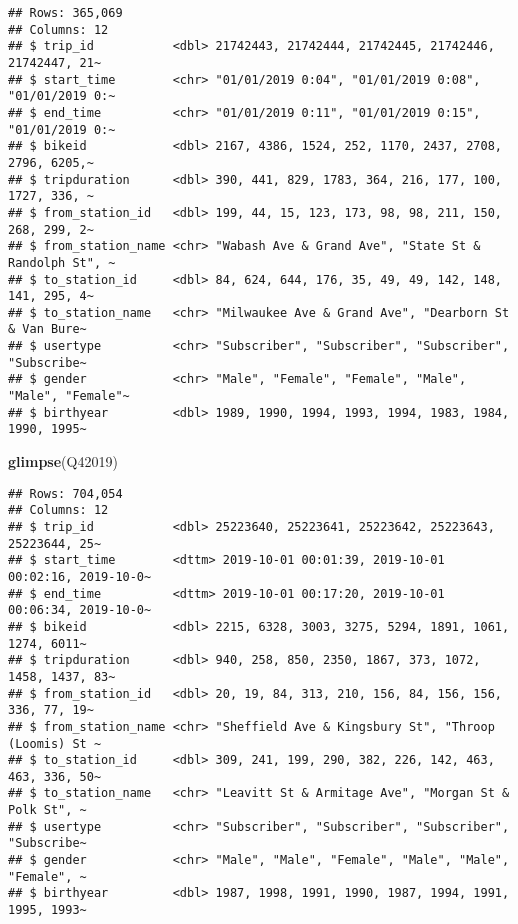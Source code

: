 \documentclass[
]{article}
\newenvironment{Shaded}{\begin{snugshade}}{\end{snugshade}}
\newcommand{\FunctionTok}[1]{\textcolor[rgb]{0.13,0.29,0.53}{\textbf{#1}}}
\newcommand{\NormalTok}[1]{#1}
\begin{document}
\begin{verbatim}
## Rows: 365,069
## Columns: 12
## $ trip_id           <dbl> 21742443, 21742444, 21742445, 21742446, 21742447, 21~
## $ start_time        <chr> "01/01/2019 0:04", "01/01/2019 0:08", "01/01/2019 0:~
## $ end_time          <chr> "01/01/2019 0:11", "01/01/2019 0:15", "01/01/2019 0:~
## $ bikeid            <dbl> 2167, 4386, 1524, 252, 1170, 2437, 2708, 2796, 6205,~
## $ tripduration      <dbl> 390, 441, 829, 1783, 364, 216, 177, 100, 1727, 336, ~
## $ from_station_id   <dbl> 199, 44, 15, 123, 173, 98, 98, 211, 150, 268, 299, 2~
## $ from_station_name <chr> "Wabash Ave & Grand Ave", "State St & Randolph St", ~
## $ to_station_id     <dbl> 84, 624, 644, 176, 35, 49, 49, 142, 148, 141, 295, 4~
## $ to_station_name   <chr> "Milwaukee Ave & Grand Ave", "Dearborn St & Van Bure~
## $ usertype          <chr> "Subscriber", "Subscriber", "Subscriber", "Subscribe~
## $ gender            <chr> "Male", "Female", "Female", "Male", "Male", "Female"~
## $ birthyear         <dbl> 1989, 1990, 1994, 1993, 1994, 1983, 1984, 1990, 1995~
\end{verbatim}

\begin{Shaded}
\begin{Highlighting}[]
\FunctionTok{glimpse}\NormalTok{(Q42019)}
\end{Highlighting}
\end{Shaded}

\begin{verbatim}
## Rows: 704,054
## Columns: 12
## $ trip_id           <dbl> 25223640, 25223641, 25223642, 25223643, 25223644, 25~
## $ start_time        <dttm> 2019-10-01 00:01:39, 2019-10-01 00:02:16, 2019-10-0~
## $ end_time          <dttm> 2019-10-01 00:17:20, 2019-10-01 00:06:34, 2019-10-0~
## $ bikeid            <dbl> 2215, 6328, 3003, 3275, 5294, 1891, 1061, 1274, 6011~
## $ tripduration      <dbl> 940, 258, 850, 2350, 1867, 373, 1072, 1458, 1437, 83~
## $ from_station_id   <dbl> 20, 19, 84, 313, 210, 156, 84, 156, 156, 336, 77, 19~
## $ from_station_name <chr> "Sheffield Ave & Kingsbury St", "Throop (Loomis) St ~
## $ to_station_id     <dbl> 309, 241, 199, 290, 382, 226, 142, 463, 463, 336, 50~
## $ to_station_name   <chr> "Leavitt St & Armitage Ave", "Morgan St & Polk St", ~
## $ usertype          <chr> "Subscriber", "Subscriber", "Subscriber", "Subscribe~
## $ gender            <chr> "Male", "Male", "Female", "Male", "Male", "Female", ~
## $ birthyear         <dbl> 1987, 1998, 1991, 1990, 1987, 1994, 1991, 1995, 1993~
\end{verbatim}
\end{document}
